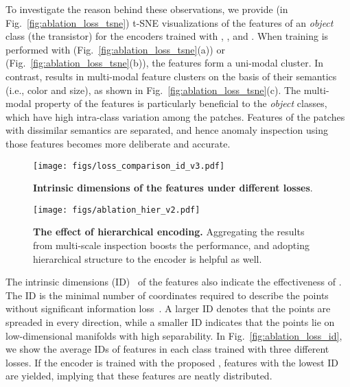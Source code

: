 \documentclass[runningheads]{llncs}
\begin{document}
To investigate the reason behind these observations, we provide (in Fig.~\ref{fig:ablation_loss_tsne}) t-SNE visualizations of the features of an \textit{object} class (the transistor) for the encoders trained with , , and .
When training is performed with  (Fig.~\ref{fig:ablation_loss_tsne}(a)) or  (Fig.~\ref{fig:ablation_loss_tsne}(b)), the features form a uni-modal cluster.
In contrast,  results in multi-modal feature clusters on the basis of their semantics (i.e., color and size), as shown in Fig.~\ref{fig:ablation_loss_tsne}(c).
The multi-modal property of the features is particularly beneficial to the \textit{object} classes, which have high intra-class variation among the patches.
Features of the patches with dissimilar semantics are separated, and hence anomaly inspection using those features becomes more deliberate and accurate.


\begin{figure}[t]
  \begin{minipage}{0.32\linewidth}
    \centering
    \vspace{-1.5em}
    \texttt{[image: figs/loss\_comparison\_id\_v3.pdf]}
    \vspace{-0.5em}
    \caption{\textbf{Intrinsic dimensions of the features under different losses}.}
    \label{fig:ablation_loss_id}
  \end{minipage}\hfill
  \begin{minipage}{0.63\linewidth}
    \centering
\texttt{[image: figs/ablation\_hier\_v2.pdf]}
    \vspace{-1.5em}
    \caption{\textbf{The effect of hierarchical encoding.} Aggregating the results from multi-scale inspection boosts the performance, and adopting hierarchical structure to the encoder is helpful as well.
    }
  \label{fig:hierarchical_helps}
  \end{minipage}\hfill
  \vspace{-1.5em}
\end{figure}
 
The intrinsic dimensions (ID)~\cite{intrinsic_dimension} of the features also indicate the effectiveness of .
The ID is the minimal number of coordinates required to describe the points without significant information loss~\cite{intrinsic_dimension2}.
A larger ID denotes that the points are spreaded in every direction, while a smaller ID indicates that the points lie on low-dimensional manifolds with high separability.
In Fig.~\ref{fig:ablation_loss_id}, we show the average IDs of features in each class trained with three different losses.
If the encoder is trained with the proposed , features with the lowest ID are yielded, implying that these features are neatly distributed.
\end{document}
